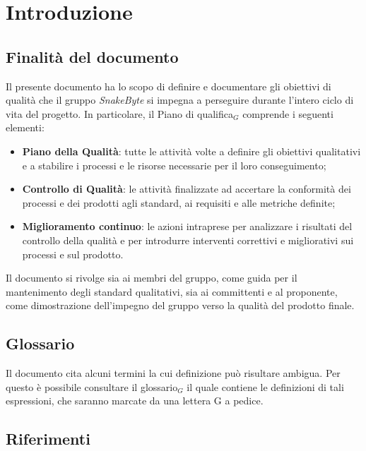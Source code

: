 \documentclass[10pt, letterpaper]{article}
\begin{document}
\newpage

\tableofcontents

\newpage
\listoffigures
\newpage
\listoftables
\newpage

\section{Introduzione}
\subsection{Finalità del documento}
Il presente documento ha lo scopo di definire e documentare gli obiettivi di qualità
che il gruppo \textit{SnakeByte} si impegna a perseguire durante l'intero ciclo di vita del
progetto. In particolare, il Piano di qualifica${_G}$ comprende i seguenti elementi:
\begin{itemize}
    \item \textbf{Piano della Qualità}: tutte le attività volte a definire gli obiettivi
          qualitativi e a stabilire i processi e le risorse necessarie per il loro conseguimento;
    \item \textbf{Controllo di Qualità}: le attività finalizzate ad accertare la conformità dei processi
          e dei prodotti agli standard, ai requisiti e alle metriche definite;
    \item \textbf{Miglioramento continuo}: le azioni intraprese per analizzare i risultati
          del controllo della qualità e per introdurre interventi correttivi e migliorativi
          sui processi e sul prodotto.
\end{itemize}
Il documento si rivolge sia ai membri del gruppo, come guida per il mantenimento
degli standard qualitativi, sia ai committenti e al proponente, come dimostrazione
dell'impegno del gruppo verso la qualità del prodotto finale.
\subsection{Glossario}
Il documento cita alcuni termini la cui definizione può risultare ambigua. Per questo è possibile consultare
il glossario${_G}$ il quale contiene le definizioni di tali espressioni, che saranno marcate da una lettera G a
pedice.
\subsection{Riferimenti}
\end{document}
